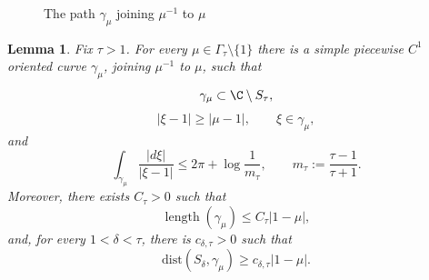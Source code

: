 \documentclass[11pt]{amsart}
\numberwithin{equation}{section}
\newtheorem{lemma}[theorem]{Lemma}
\theoremstyle{definition}
\theoremstyle{plain}
\def\dist{\mathrm{dist}}
\begin{document}
\begin{figure}[ht]
\caption{The path $\gamma_\mu$ joining $\mu^{-1}$ to $\mu$}
\end{figure}

\begin{lemma}\label{lem:cutexists}
Fix \(\tau>1\).  For every
\(\mu\in\Gamma_\tau\setminus\{1\}\) there is a simple piecewise \(C^1\)
oriented curve \(\gamma_\mu\), joining \(\mu^{-1}\) to \(\mu\), such that
\[
        \gamma_\mu\subset\C\setminus S_\tau,
\]
\begin{equation}\label{eq:cut-away-from-vertex}
        |\xi-1|\ge |\mu-1|,
        \qquad \xi\in\gamma_\mu,
\end{equation}
and
\begin{equation}\label{eq:cut-integral-bound}
        \int_{\gamma_\mu}\frac{|d\xi|}{|\xi-1|}
        \le
        2\pi+\log\frac1{m_\tau},
        \qquad
        m_\tau:=\frac{\tau-1}{\tau+1}.
\end{equation}
Moreover, there exists $C_\tau>0$ such that
\begin{equation}\label{eq:cut-length-bound}
        \operatorname{length}(\gamma_\mu)
        \le C_\tau |1-\mu|,
\end{equation}
and, for every \(1<\delta<\tau\), there is \(c_{\delta,\tau}>0\) such that
\begin{equation}\label{eq:cut-distance-bound}
        \dist(S_\delta,\gamma_\mu)
        \ge c_{\delta,\tau}|1-\mu|.
\end{equation}
\end{lemma}
\end{document}
